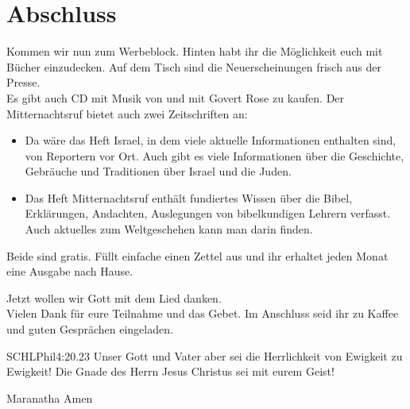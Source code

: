 \section{Abschluss}
Kommen wir nun zum Werbeblock. Hinten habt ihr die Möglichkeit euch mit Bücher einzudecken. Auf dem Tisch sind die Neuerscheinungen frisch aus der Presse.\\
Es gibt auch CD mit Musik von und mit Govert Rose zu kaufen.
Der Mitternachtsruf bietet auch zwei Zeitschriften an:
\begin{itemize}
    \item Da wäre das Heft Israel, in dem viele aktuelle Informationen enthalten sind, von Reportern vor Ort. Auch gibt es viele Informationen über die Geschichte, Gebräuche und Traditionen über Israel und die Juden.
    \item Das Heft Mitternachtsruf enthält fundiertes Wissen über die Bibel, Erklärungen, Andachten, Auslegungen von bibelkundigen Lehrern verfasst. Auch aktuelles zum Weltgeschehen kann man darin finden.
\end{itemize}
Beide sind gratis. Füllt einfache einen Zettel aus und ihr erhaltet jeden Monat eine Ausgabe nach Hause.

Jetzt wollen wir Gott mit dem Lied  danken.\\
Vielen Dank für eure Teilnahme und das Gebet. Im Anschluss seid ihr zu Kaffee und guten Gesprächen eingeladen.
\beten{} \\

\begin{bibelbox}{SCHL}{Phil}{4:20.23}
Unser Gott und Vater aber sei die Herrlichkeit von Ewigkeit zu Ewigkeit!
Die Gnade des Herrn Jesus Christus sei mit eurem Geist!
\end{bibelbox}
Maranatha Amen
